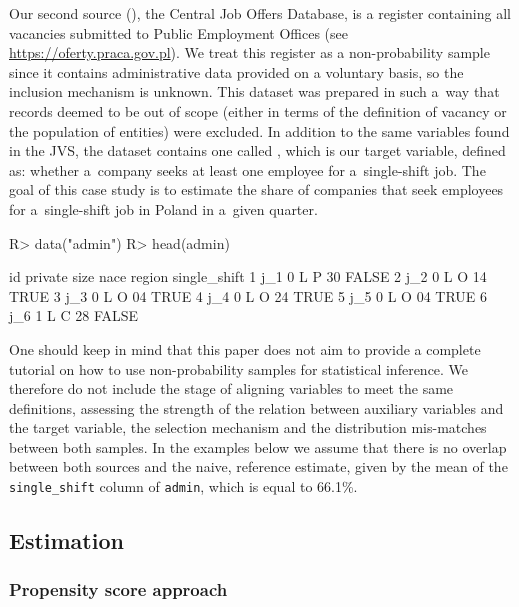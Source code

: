 \documentclass[nojss]{jss}
\begin{document}
Our second source (), the Central Job Offers Database, is a
register containing all vacancies submitted to Public Employment Offices
(see \url{https://oferty.praca.gov.pl}). We treat this register as a
non-probability sample since it contains administrative data provided on
a voluntary basis, so the inclusion mechanism is unknown. This dataset
was prepared in such a~way that records deemed to be out of scope
(either in terms of the definition of vacancy or the population of
entities) were excluded. In addition to the same variables found in the
JVS, the dataset contains one called , which is our
target variable, defined as: whether a~company seeks at least one
employee for a~single-shift job. The goal of this case study is to
estimate the share of companies that seek employees for a~single-shift
job in Poland in a~given quarter.

\begin{CodeChunk}
\begin{CodeInput}
R> data("admin")
R> head(admin)
\end{CodeInput}
\begin{CodeOutput}
   id private size nace region single_shift
1 j_1       0    L    P     30        FALSE
2 j_2       0    L    O     14         TRUE
3 j_3       0    L    O     04         TRUE
4 j_4       0    L    O     24         TRUE
5 j_5       0    L    O     04         TRUE
6 j_6       1    L    C     28        FALSE
\end{CodeOutput}
\end{CodeChunk}

One should keep in mind that this paper does not aim to provide a
complete tutorial on how to use non-probability samples for statistical
inference. We therefore do not include the stage of aligning variables
to meet the same definitions, assessing the strength of the relation
between auxiliary variables and the target variable, the selection
mechanism and the distribution mis-matches between both samples. In the
examples below we assume that there is no overlap between both sources
and the naive, reference estimate, given by the mean of the
\texttt{single\_shift} column of \texttt{admin}, which is equal to
66.1\%.

\subsection{Estimation}\label{estimation}

\subsubsection{Propensity score
approach}\label{propensity-score-approach}
\end{document}
